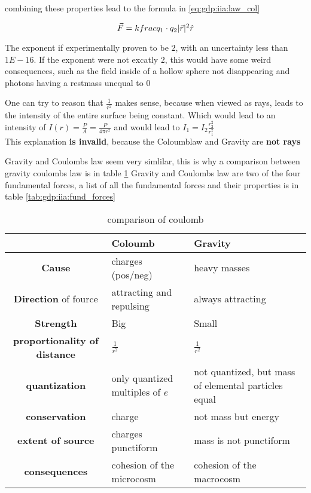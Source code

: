 combining these properties lead to the formula in \ref{eq:gdp:iia:law_col}

\begin{equation}
    \label{eq:gdp:iia:law_col}
    \vec{F} = k frac{q_1\cdot q_2}{\lvert \vec{r} \rvert^2} \hat{r} 
\end{equation}

The exponent if experimentally proven to be $2$,
    with an uncertainty less than $1E-16$.
If the exponent were not excatly $2$,
    this would have some weird consequences,
    such as the field inside of a hollow sphere not disappearing and
    photons having a restmass unequal to $0$

One can try to reason that $\frac{1}{r^2}$ makes sense,
    because when viewed as rays, 
    leads to the intensity of the entire surface being constant.
Which would lead to an intensity of $I(r) = \frac{P}{A} = \frac{P}{4\pi r^2}$
and would lead to $I_1 = I_2 \frac{r_2^2}{r_1^2}$\\

This explanation \textbf{is invalid},
    because the Coloumblaw and Gravity are \textbf{not rays}\par


Gravity and Coulombs law seem very simlilar, 
    this is why a comparison between gravity coulombs law is in table \ref{tab:gdp:iia:coulomb_gravity} 
Gravity and Coulombs law are two of the four fundamental forces,
    a list of all the fundamental forces and their properties is in table \ref{tab:gdp:iia:fund_forces}

\begin{table}
    \begin{tabularx}{1.25\textwidth}{|c | l | X|}
        \hline
        & \textbf{Coloumb} & \textbf{Gravity}\\ 
        \hline
        \textbf{Cause} & charges (pos/neg) & heavy masses \\ 
        \textbf{Direction} of fource & attracting and repulsing & always attracting \\ 
        \textbf{Strength} & Big & Small \\ 
        \textbf{proportionality of distance} &  $\frac{1}{r^2}$ & $\frac{1}{r^2}$ \\
        \textbf{quantization} & only quantized multiples of $e$ & not quantized, but mass of elemental particles equal \\ 
        \textbf{conservation} & charge & not mass but energy \\ 
        \textbf{extent of source} & charges punctiform & mass is not punctiform \\ 
        \textbf{consequences} & cohesion of the microcosm & cohesion of the macrocosm \\ 
        \hline
    \end{tabularx}
    \caption{comparison of coulomb}
    \label{tab:gdp:iia:coulomb_gravity}
\end{table}

